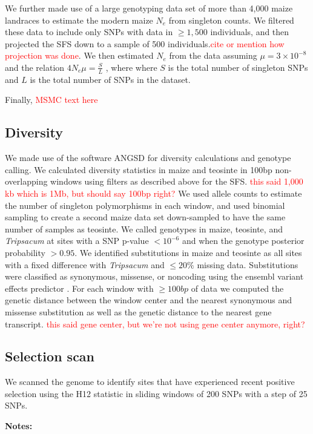 \documentclass{pnastwo}
\newcommand{\jri}[1]{\textcolor{red}{\scriptsize #1}}
\begin{document}
\begin{article}
\begin{materials}
We further made use of a large genotyping data set of more than 4,000 maize landraces \cite{Hearne2015} to estimate the modern maize $N_e$ from singleton counts.
We filtered these data to include only SNPs with data in $\geq 1,500$ individuals, and then projected the SFS down to a sample of 500 individuals.\jri{cite or mention how projection was done}. 
We then estimated $N_e$ from the data assuming $\mu = 3 \times 10^{-8}$ \cite{clark2005} and the relation  $4N_e\mu = \frac{S}{L}$ \cite{fu1993}, where where $S$ is the total number of singleton SNPs and $L$ is the total number of SNPs in the dataset.

Finally, \jri{MSMC text here}

\subsection{Diversity}
We made use of the software ANGSD \cite{korneliussen2014} for diversity calculations and genotype calling. 
We calculated diversity statistics in maize and teosinte in 100bp non-overlapping windows using filters as described above for the SFS. \jri{this said 1,000 kb which is 1Mb, but should say 100bp right?}
We used allele counts to estimate the number of singleton polymorphisms in each window, and used binomial sampling to create a second maize data set down-sampled to have the same number of samples as teosinte.
We called genotypes in maize, teosinte, and \emph{Tripsacum} at sites with a SNP p-value $<10^{-6}$ and when the genotype posterior probability $>0.95$.
We identified substitutions in maize and teosinte as all sites with a fixed difference with \emph{Tripsacum} and $\leq 20\%$ missing data. 
Substitutions were classified as synonymous, missense, or noncoding using the ensembl variant effects predictor \cite{mclaren2010}.
For each window with $\geq 100bp$ of data we computed the genetic distance between the window center and the nearest synonymous and missense substitution as well as the genetic distance to the nearest gene transcript. \jri{this said gene center, but we're not using gene center anymore, right?} 

\subsection{Selection scan}
We scanned the genome to identify sites that have experienced recent positive selection using the H12 statistic \cite{garud2015} in sliding windows of 200 SNPs with a step of 25 SNPs.

\color{red}
{\bf Notes:}
\begin{itemize}
 

\end{itemize}
\end{materials}
\end{article}
\end{document}
